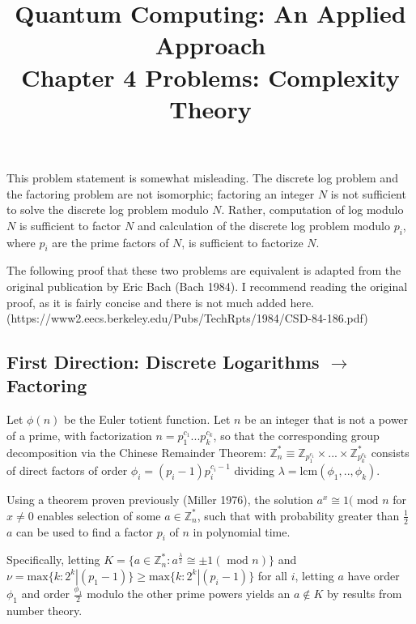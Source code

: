 \documentclass{article}
\date{}
\title{\textbf{Quantum Computing: An Applied Approach}\\\vspace*{1cm}
Chapter 4 Problems: Complexity Theory
}
\begin{document}
\maketitle

\section{}

This problem statement is somewhat misleading. The discrete log problem and the factoring problem are not isomorphic; factoring an integer $N$ is not sufficient to solve the discrete log problem modulo $N$. Rather, computation of log modulo $N$ is sufficient to factor $N$ and calculation of the discrete log problem modulo $p_i$, where $p_i$ are the prime factors of $N$, is sufficient to factorize $N$.

The following proof that these two problems are equivalent is adapted from the original publication by Eric Bach (Bach 1984). I recommend reading the original proof, as it is fairly concise and there is not much added here.\newline
(https://www2.eecs.berkeley.edu/Pubs/TechRpts/1984/CSD-84-186.pdf)

\subsection{First Direction: Discrete Logarithms $\rightarrow$ Factoring}

 Let $\phi(n)$ be the Euler totient function. Let $n$ be an integer that is not a power of a prime, with factorization $n=p_1^{c_1}...p_k^{c_k}$, so that the corresponding group decomposition via the Chinese Remainder Theorem: $\mathbb{Z}_n^{*}\equiv\mathbb{Z}_{p_1^{c_1}}\times ...\times\mathbb{Z}_{p_k^{c_k}}^{*}$ consists of direct factors of order $\phi_i=(p_i-1)p_i^{c_i-1}$ dividing $\lambda=\text{lcm}(\phi_1,..,\phi_k)$.

Using a theorem proven previously (Miller 1976), the solution $a^x\cong 1(\text{ mod }n$ for $x\neq 0$ enables selection of some $a\in\mathbb{Z}_n^{*}$, such that with probability greater than $\frac{1}{2}$ $a$ can be used to find a factor $p_i$
 of $n$ in polynomial time.
 
 Specifically, letting $K=\{a\in\mathbb{Z}_n^{*}:a^{\frac{\lambda}{2}}\cong\pm 1(\text{ mod }n)\}$ and $\nu=\text{max}\{k:2^k|(p_1-1)\}\geq\text{max}\{k:2^k|(p_i-1)\}$ for all $i$, letting $a$ have order $\phi_1$ and order $\frac{\phi_1}{2}$ modulo the other prime powers yields an $a\not\in K$ by results from number theory.
 
\end{document}

